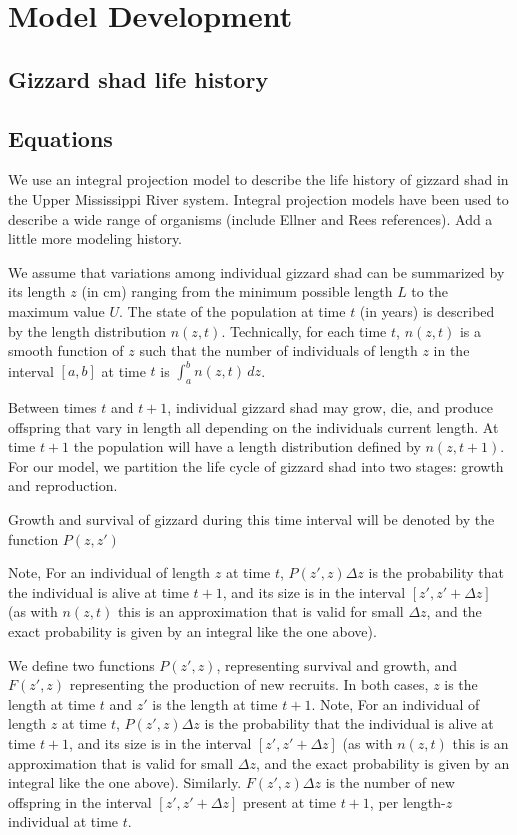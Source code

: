 \documentclass[11pt,oneside]{amsart}
\def\ds{\displaystyle}
\theoremstyle{definition}
\begin{document}
\section{Model Development}
\subsection{Gizzard shad life history}

\subsection{Equations}
We use an integral projection model to describe the life history of gizzard shad in the Upper Mississippi River system.  Integral projection models have been used to describe a wide range of organisms (include Ellner and Rees references).  Add a little more modeling history.

We assume that variations among individual gizzard shad can be summarized by its length $z$ (in cm) ranging from the minimum possible length $L$ to the maximum value $U$.  The state of the population at time $t$ (in years) is described by the length distribution $n(z,t)$.  Technically, for each time $t$, $n(z,t)$ is a smooth function of $z$ such that the number of individuals of length $z$ in the interval $[a,b]$ at time $t$ is $\ds \int_a^b n(z,t) \, dz$. 

Between times $t$ and $t+1$, individual gizzard shad may grow, die, and produce offspring that vary in length all depending on the individuals current length. At time $t+1$ the population will have a length distribution defined by $n(z, t+1)$. For our model, we partition the life cycle of gizzard shad into two stages: growth and reproduction.  

Growth and survival of gizzard during this time interval will be denoted by the function $P(z,z')$

 Note, For an individual of length $z$ at time $t$, $P(z',z)\Delta z$ is the probability that the individual is alive at time $t+1$, and its size is in the interval $[z', z' + \Delta z]$ (as with $n(z,t)$ this is an approximation that is valid for small $\Delta z$, and the exact probability is given by an integral like the one above).

We define two functions $P(z',z)$, representing survival and growth, and $F(z',z)$ representing the production of new recruits.  In both cases, $z$ is the length at time $t$ and $z'$ is the length at time $t+1$.  Note, For an individual of length $z$ at time $t$, $P(z',z)\Delta z$ is the probability that the individual is alive at time $t+1$, and its size is in the interval $[z', z' + \Delta z]$ (as with $n(z,t)$ this is an approximation that is valid for small $\Delta z$, and the exact probability is given by an integral like the one above). Similarly. $F(z',z)\Delta z$ is the number of new offspring in the interval $[z', z' + \Delta z]$ present at time $t+1$, per length-$z$ individual at time $t$.
\end{document}
